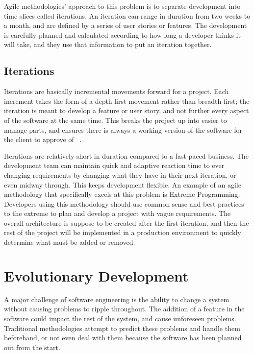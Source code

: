 \documentclass[11pt]{article}
\newcommand{\tab}{\hspace*{2em}}
\begin{document}
\begin{doublespace}
\tab Agile methodologies’ approach to this problem is to separate development into time slices called iterations. An iteration can range in duration from two weeks to a month, and are defined by a series of user stories or features. The development is carefully planned and calculated according to how long a developer thinks it will take, and they use that information to put an iteration together. 

\subsection{Iterations} 

\tab Iterations are basically incremental movements forward for a project. Each increment takes the form of a depth first movement rather than breadth first; the iteration is meant to develop a feature or user story, and not further every aspect of the software at the same time. This breaks the project up into easier to manage parts, and ensures there is always a working version of the software for the client to approve of ~\cite{Sletholt:2011:LRA:1985782.1985784}.

\tab Iterations are relatively short in duration compared to a fast-paced business. The development team can maintain quick and adaptive reaction time to ever changing requirements by changing what they have in their next iteration, or even midway through. This keeps development flexible. An example of an agile methodology that specifically excels at this problem is Extreme Programming. Developers using this methodology should use common sense and best practices to the extreme to plan and develop a project with vague requirements. The overall architecture is suppose to be created after the first iteration, and then the rest of the project will be implemented in a production environment to quickly determine what must be added or removed.  

\section{Evolutionary Development}

\tab A major challenge of software engineering is the ability to change a system without causing problems to ripple throughout. The addition of a feature in the software could impact the rest of the system, and cause unforeseen problems. Traditional methodologies attempt to predict these problems and handle them beforehand, or not even deal with them because the software has been planned out from the start. 


\end{doublespace}
\end{document}
